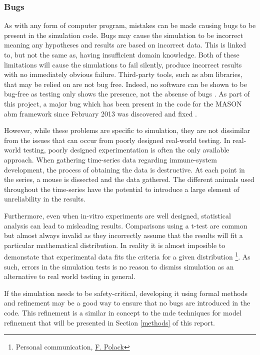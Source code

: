 \documentclass{UoYCSproject}
\begin{document}
\subsubsection{Bugs}
As with any form of computer program, mistakes can be made causing bugs to be present in the simulation code.
Bugs may cause the simulation to be incorrect meaning any hypotheses and results are based on incorrect data.
This is linked to, but not the same as, having insufficient domain knowledge.
Both of these limitations will cause the simulations to fail silently, produce incorrect results with no immediately obvious failure.
Third-party tools, such as \gls{abm} libraries, that may be relied on are not bug free.
Indeed, no software can be shown to be bug-free as testing only shows the presence, not the absense of bugs \cite[p.16]{dijkstra}.
As part of this project, a major bug which has been present in the code for the \gls{MASON} \gls{abm} framework since February 2013 was discovered and fixed \cite{mason_pull_request}.


However, while these problems are specific to simulation, they are not dissimilar from the issues that can occur from poorly designed real-world testing.
In real-world testing, poorly designed experimentation is often the only available approach.
When gathering time-series data regarding immune-system development, the process of obtaining the data is destructive.
At each point in the series, a mouse is dissected and the data gathered.
The different animals used throughout the time-series have the potential to introduce a large element of unreliability in the results.

Furthermore, even when \gls{in-vitro} experiments are well designed, statistical analysis can lead to misleading results.
Comparisons using a t-test are common but almost always invalid as they incorrectly assume that the results will fit a particular mathematical distribution.
In reality it is almost imposible to demonstate that experimental data fits the criteria for a given distribution \footnote{Personal communication, \href{http://www.scm.keele.ac.uk/staff/f_polack/}{F. Polack}}.
As such, errors in the simulation tests is no reason to dismiss simulation as an alternative to real world testing in general.

If the simulation needs to be safety-critical, developing it using formal methods and refinement may be a good way to ensure that no bugs are introduced in the code.
This refinement is a similar in concept to the \gls{mde} techniques for model refinement that will be presented in Section \ref{methods} of this report.
\end{document}
